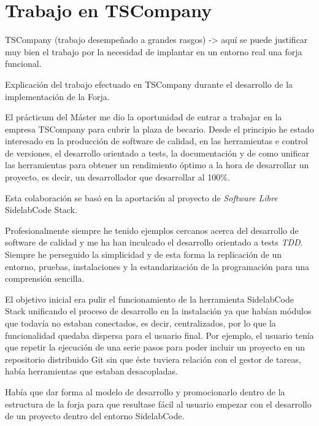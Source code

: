
\section{Trabajo en TSCompany}
\label{sec:trabajo-tscompany}

\par TSCompany (trabajo desempeñado a grandes rasgos) -> aquí se puede justificar muy bien el trabajo por la necesidad de implantar en un entorno real una forja funcional.

\par Explicaci\'on del trabajo efectuado en TSCompany durante el desarrollo de la implementaci\'on de la Forja.

\par El pr\'acticum del M\'aster me dio la oportunidad de entrar a trabajar en la empresa TSCompany para cubrir la plaza de becario. Desde el principio he estado interesado en la producción de software de calidad, en las herramientas e control de versiones, el desarrollo orientado a tests, la documentación y de como unificar las herramientas para obtener un rendimiento óptimo a la hora de desarrollar un proyecto, es decir, un desarrollador que desarrollar al 100\%.

\par Esta colaboraci\'on se bas\'o en la aportaci\'on al proyecto de \emph{Software Libre} SidelabCode Stack.

\par Profesionalmente siempre he tenido ejemplos cercanos acerca del desarrollo de software de calidad y me ha han inculcado el desarrollo orientado a tests \emph{TDD}. Siempre he perseguido la simplicidad y de esta forma la replicaci\'on de un entorno, pruebas, instalaciones y la estandarizaci\'on de la programaci\'on para una comprensi\'on sencilla.

\par El objetivo inicial era pulir el funcionamiento de la herramienta SidelabCode Stack unificando el proceso de desarrollo en la instalaci\'on ya que hab\'ian m\'odulos que todav\'ia no estaban conectados, es decir, centralizados, por lo que la funcionalidad quedaba dispersa para el usuario final. Por ejemplo, el usuario ten\'ia que repetir la ejecución de una serie pasos para poder incluir un proyecto en un repositorio distribuido Git sin que éste tuviera relación con el gestor de tareas, había herramientas que estaban desacopladas.

\par Hab\'ia que dar forma al modelo de desarrollo y promocionarlo dentro de la estructura de la forja para que resultase f\'acil al usuario empezar con el desarrollo de un proyecto dentro del entorno SidelabCode.

